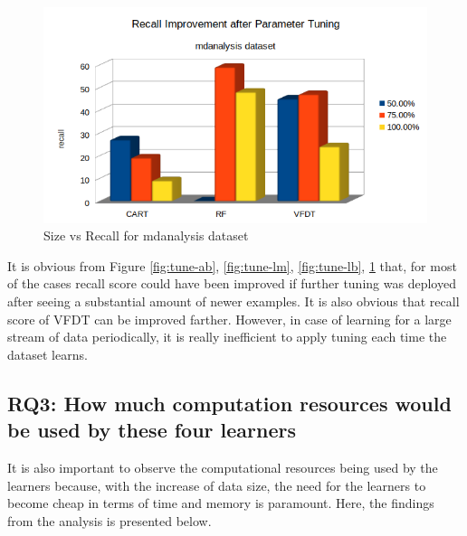 \documentclass[sigplan]{acmart}\settopmatter{printfolios=true,printccs=false,printacmref=false}
\begin{document}
\begin{figure}[h]
	\includegraphics[width=\linewidth]{fig/tune-md.png}
	\caption{Size vs Recall for mdanalysis dataset}
	\label{fig:tune-md}
\end{figure}

It is obvious from Figure \ref{fig:tune-ab}, \ref{fig:tune-lm}, \ref{fig:tune-lb}, \ref{fig:tune-md} that, for most of the cases recall score could have been improved if further tuning was deployed after seeing a substantial amount of newer examples. It is also obvious that recall score of VFDT can be improved farther. However, in case of learning for a large stream of data periodically, it is really inefficient to apply tuning each time the dataset learns. 

\subsection{RQ3: How much computation resources would be used by these four learners}
It is also important to observe the computational resources being used by the learners because, with the increase of data size, the need for the learners to become cheap in terms of time and memory is paramount. Here, the findings from the analysis is presented below.
\end{document}
